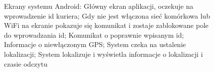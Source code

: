 \documentclass[eng,printmode,oneside]{mgr}
\begin{document}
\begin{figure}
\caption{Ekrany systemu Android:  Główny ekran
aplikacji, oczekuje na wprowadzenie id
kuriera;  Gdy nie jest włączona sieć komórkowa lub WiFi na
ekranie pokazuje się komunikat i zostaje zablokowane pole do wprowadzania
id;  Komunikat o poprawnie wpisanym id;  Informacje
o niewłączonym GPS;  System czeka na ustalenie lokalizacji;
 System lokalizuje i wyświetla informacje o lokalizacji i czasie
odczytu}
\label{fig:androidViewOK}
\end{figure}
\end{document}
